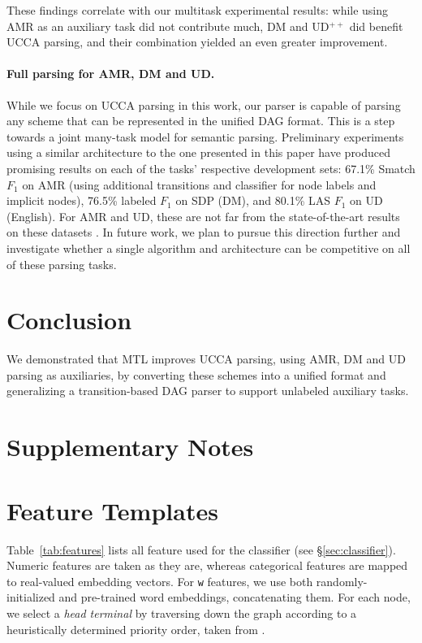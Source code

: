 \documentclass[11pt,a4paper]{article}
\begin{document}
These findings correlate with our multitask experimental results:
while using AMR as an auxiliary task did not contribute much, DM and UD$^{++}$ did benefit UCCA
parsing, and their combination yielded an even greater improvement.

\paragraph{Full parsing for AMR, DM and UD.}
While we focus on UCCA parsing in this work, our parser is capable of parsing any
scheme that can be represented in the unified DAG format.
This is a step towards a joint many-task model for semantic parsing.
Preliminary experiments using a similar architecture to the one presented in this paper have produced
promising results on each of the tasks' respective development sets:
67.1\% Smatch $F_1$ \cite{cai2013smatch} on AMR
(using additional transitions and classifier for node labels and implicit nodes),
76.5\% labeled $F_1$ on SDP (DM),
and 80.1\% LAS $F_1$ on UD (English).
For AMR and UD, these are not far from the state-of-the-art results on these datasets
\cite{foland2017abstract,dozat2016deep}.
In future work, we plan to pursue this direction further and investigate whether a single
algorithm and architecture can be competitive on all of these parsing tasks.

\section{Conclusion}\label{sec:conclusion}

We demonstrated that MTL improves UCCA parsing,
using AMR, DM and UD parsing as auxiliaries,
by converting these schemes into a unified format
and generalizing a transition-based DAG parser to support unlabeled auxiliary tasks.






\appendix

\section*{Supplementary Notes}

\section{Feature Templates}\label{sec:features}

Table~\ref{tab:features} lists all feature used for the classifier (see \S\ref{sec:classifier}).
Numeric features are taken as they are, whereas categorical features are mapped to real-valued embedding
vectors.
For \texttt{w} features,
we use both randomly-initialized and pre-trained word embeddings, concatenating them.
For each node, we select a \textit{head terminal} by traversing down the graph according to
a heuristically determined priority order, taken from \citet{hershcovich2017a}.
\end{document}
